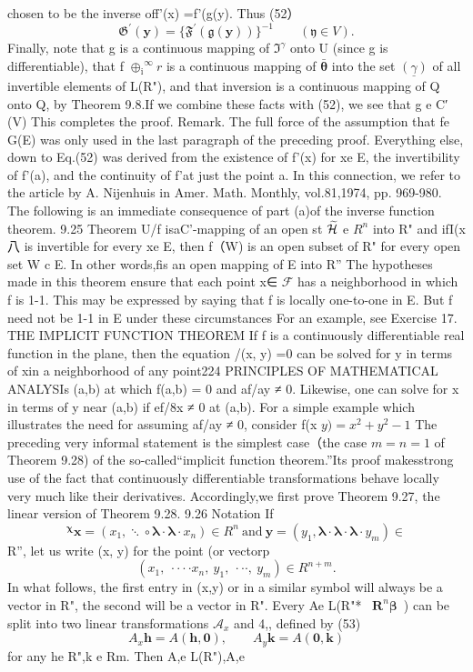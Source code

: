 chosen to be the inverse off'(x) =f'(g(y). Thus (52） $$ {\mathfrak{G}}^{\prime}({\mathbf{y}})=\{{\mathfrak{F}}^{\prime}({\mathfrak{g}}({\mathbf{y}}))\}^{-1}\qquad({\mathfrak{y}}\in V). $$ Finally, note that g is a continuous mapping of ${\mathfrak{I}}^{\gamma}$ onto U (since g is differentiable), that f $\textstyle{\oplus_{\mathrm{i}}}^{\infty}r$ is a continuous mapping of $\bar{\boldsymbol{\theta}}$ into the set $\underline{{\left(\gamma\right)}}$ of all invertible elements of L(R"), and that inversion is a continuous mapping of Q onto Q, by Theorem 9.8.If we combine these facts with (52), we see that g e C′(V) This completes the proof. Remark. The full force of the assumption that fe G(E) was only used in the last paragraph of the preceding proof. Everything else, down to Eq.(52) was derived from the existence of f'(x) for xe E, the invertibility of f'(a), and the continuity of f’at just the point a. In this connection, we refer to the article by A. Nijenhuis in Amer. Math. Monthly, vol.81,1974, pp. 969-980. The following is an immediate consequence of part (a)of the inverse function theorem. 9.25 Theorem U/f isaC'-mapping of an open st ${\widetilde{\cal H}}$ e $R^{n}$ into R" and ifI(x八 is invertible for every xe E, then f（W) is an open subset of R" for every open set W c E. In other words,fis an open mapping of E into R” The hypotheses made in this theorem ensure that each point x∈ $\textstyle{\mathcal{F}}$ has a neighborhood in which f is 1-1. This may be expressed by saying that f is locally one-to-one in E. But f need not be 1-1 in E under these circumstances For an example, see Exercise 17. THE IMPLICIT FUNCTION THEOREM If f is a continuously differentiable real function in the plane, then the equation /(x, y) =0 can be solved for y in terms of xin a neighborhood of any point224 PRINCIPLES OF MATHEMATICAL ANALYSIs (a,b) at which f(a,b) = 0 and af/ay ≠ 0. Likewise, one can solve for x in terms of y near (a,b) if ef/8x ≠ 0 at (a,b). For a simple example which illustrates the need for assuming af/ay ≠ 0, consider f(x $y)=x^{2}+y^{2}-1$ The preceding very informal statement is the simplest case（the case $m=n=1$ of Theorem 9.28) of the so-called“implicit function theorem.”Its proof makesstrong use of the fact that continuously differentiable transformations behave locally very much like their derivatives. Accordingly,we first prove Theorem 9.27, the linear version of Theorem 9.28. 9.26 Notation If $$ {}^{\mathbf{\chi}}\mathbf{x}=\left(x_{1},\mathbf{\ddots}\circ\mathbf{\lambda}\cdot\mathbf{\lambda}\cdot x_{n}\right)\in R^{n}{\mathrm{~and~}}\mathbf{y}=\left(y_{1},\mathbf{\lambda}\cdot\mathbf{\lambda}\cdot\mathbf{\lambda}\cdot y_{m}\right)\in $$ R”, let us write (x, y) for the point (or vectorp $$ \left(x_{1},\ \cdot\cdot\cdot\cdot x_{n},\ y_{1},\ \cdot\cdot\cdot,\ y_{m}\right)\in R^{n+m}. $$ In what follows, the first entry in (x,y) or in a similar symbol will always be a vector in R", the second will be a vector in R". Every Ae L(R"*~ ${\boldsymbol{R}}^{n}{\boldsymbol{\beta}}\,$ ) can be split into two linear transformations ${\mathcal{A}}_{x}$ and 4,, defined by (53) $$ A_{x}\mathbf{h}=A(\mathbf{h},\mathbf{0}),\qquad A_{y}\mathbf{k}=A(\mathbf{0},\mathbf{k}) $$ for any he R",k e Rm. Then A,e L(R"),A,e 